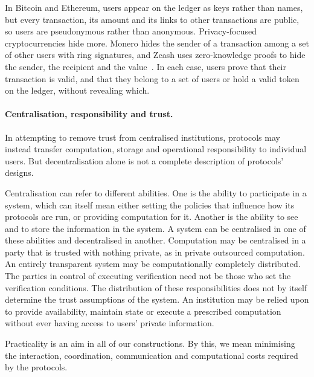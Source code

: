 In Bitcoin and
Ethereum, users appear on the ledger as keys rather than names, but every
transaction, its amount and its links to other transactions are public, so
users are pseudonymous rather than anonymous. Privacy-focused cryptocurrencies
hide more. Monero hides the sender of a transaction among a set of other users
with ring signatures, and Zcash uses zero-knowledge proofs to hide the sender,
the recipient and the value~\cite{EPRINT:Noether15,SP:BCGGMT14}. In each case,
users prove that their transaction is valid, and that they belong to a set of
users or hold a valid token on the ledger, without revealing which.

\paragraph{Centralisation, responsibility and trust.} In attempting to remove
trust from centralised institutions, protocols may instead transfer
computation, storage and operational responsibility to individual users. But
decentralisation alone is not a complete description of protocols' designs.

Centralisation can refer to different abilities. One is the ability to
participate in a system, which can itself mean either setting the policies that
influence how its protocols are run, or providing computation for it. Another
is the ability to see and to store the information in the system. A system can
be centralised in one of these abilities and decentralised in another.
Computation may be centralised in a party that is trusted with nothing private,
as in private outsourced computation. An entirely transparent system may be
computationally completely distributed. The parties in control of executing
verification need not be those who set the verification conditions. The
distribution of these responsibilities does not by itself determine the trust
assumptions of the system. An institution may be relied upon to provide
availability, maintain state or execute a prescribed computation without ever
having access to users' private information.

Practicality is an aim in all of our constructions. By this, we mean
minimising the interaction, coordination, communication and computational costs
required by the protocols.

